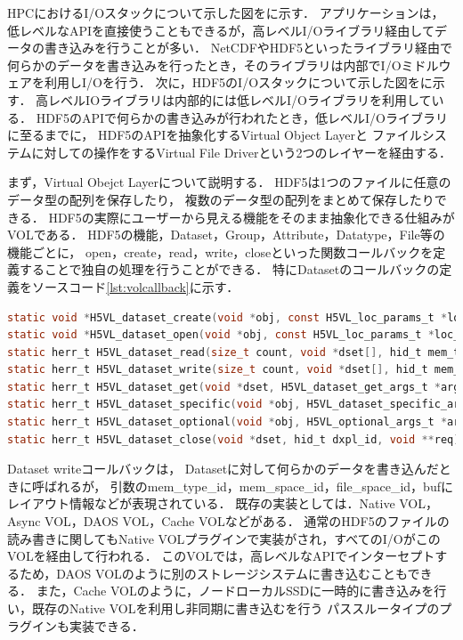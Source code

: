 \documentclass[submit,techrep,noauthor]{ipsj}
\newcommand{\lstref}[1]{ソースコード\ref{#1}}
\begin{document}
HPCにおけるI/Oスタックについて示した図をに示す．
アプリケーションは，低レベルなAPIを直接使うこともできるが，高レベルI/Oライブラリ経由してデータの書き込みを行うことが多い．
NetCDFやHDF5といったライブラリ経由で何らかのデータを書き込みを行ったとき，そのライブラリは内部でI/Oミドルウェアを利用しI/Oを行う．
次に，HDF5のI/Oスタックについて示した図をに示す．
高レベルIOライブラリは内部的には低レベルI/Oライブラリを利用している．
HDF5のAPIで何らかの書き込みが行われたとき，低レベルI/Oライブラリに至るまでに，
HDF5のAPIを抽象化するVirtual Object Layerと
ファイルシステムに対しての操作をするVirtual File Driverという2つのレイヤーを経由する．

まず，Virtual Obejct Layerについて説明する．
HDF5は1つのファイルに任意のデータ型の配列を保存したり，
複数のデータ型の配列をまとめて保存したりできる．
HDF5の実際にユーザーから見える機能をそのまま抽象化できる仕組みがVOLである．
HDF5の機能，Dataset，Group，Attribute，Datatype，File等の機能ごとに，
open，create，read，write，closeといった関数コールバックを定義することで独自の処理を行うことができる．
特にDatasetのコールバックの定義を\lstref{lst:volcallback}に示す．
\begin{lstlisting}[caption=VOLのDatasetのコールバックの定義,label=lst:volcallback,language=c]
static void *H5VL_dataset_create(void *obj, const H5VL_loc_params_t *loc_params, const char *name, hid_t lcpl_id, hid_t type_id, hid_t space_id, hid_t dcpl_id, hid_t dapl_id, hid_t dxpl_id, void **req);
static void *H5VL_dataset_open(void *obj, const H5VL_loc_params_t *loc_params, const char *name, hid_t dapl_id, hid_t dxpl_id, void **req);
static herr_t H5VL_dataset_read(size_t count, void *dset[], hid_t mem_type_id[], hid_t mem_space_id[], hid_t file_space_id[], hid_t plist_id, void *buf[], void **req);
static herr_t H5VL_dataset_write(size_t count, void *dset[], hid_t mem_type_id[], hid_t mem_space_id[], hid_t file_space_id[], hid_t plist_id, const void *buf[], void **req);
static herr_t H5VL_dataset_get(void *dset, H5VL_dataset_get_args_t *args, hid_t dxpl_id, void **req);
static herr_t H5VL_dataset_specific(void *obj, H5VL_dataset_specific_args_t *args, hid_t dxpl_id, void **req);
static herr_t H5VL_dataset_optional(void *obj, H5VL_optional_args_t *args, hid_t dxpl_id, void **req);
static herr_t H5VL_dataset_close(void *dset, hid_t dxpl_id, void **req);
\end{lstlisting}
Dataset writeコールバックは，
Datasetに対して何らかのデータを書き込んだときに呼ばれるが，
引数のmem\_type\_id，mem\_space\_id，file\_space\_id，bufにレイアウト情報などが表現されている．
既存の実装としては．Native VOL，Async VOL，DAOS VOL，Cache VOLなどがある．
通常のHDF5のファイルの読み書きに関してもNative VOLプラグインで実装がされ，すべてのI/OがこのVOLを経由して行われる．
このVOLでは，高レベルなAPIでインターセプトするため，DAOS VOLのように別のストレージシステムに書き込むこともできる．
また，Cache VOLのように，ノードローカルSSDに一時的に書き込みを行い，既存のNative VOLを利用し非同期に書き込むを行う
パススルータイプのプラグインも実装できる．
\end{document}

